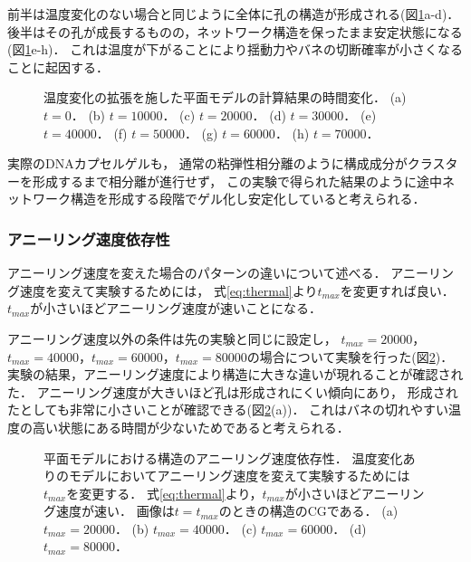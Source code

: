 前半は温度変化のない場合と同じように全体に孔の構造が形成される(図\ref{fig:result_2d_with_anearing}a-d)．
後半はその孔が成長するものの，ネットワーク構造を保ったまま安定状態になる(図\ref{fig:result_2d_with_anearing}e-h)．
これは温度が下がることにより揺動力やバネの切断確率が小さくなることに起因する．
\begin{figure}
    \centering
    
    \caption{
        温度変化の拡張を施した平面モデルの計算結果の時間変化．
        (a) $t=0$．
        (b) $t=10000$．
        (c) $t=20000$．
        (d) $t=30000$．
        (e) $t=40000$．
        (f) $t=50000$．
        (g) $t=60000$．
        (h) $t=70000$．
    }
    \label{fig:result_2d_with_anearing}
\end{figure}

実際のDNAカプセルゲルも，
通常の粘弾性相分離のように構成成分がクラスターを形成するまで相分離が進行せず，
この実験で得られた結果のように途中ネットワーク構造を形成する段階でゲル化し安定化していると考えられる．


\subsubsection{アニーリング速度依存性}
アニーリング速度を変えた場合のパターンの違いについて述べる．
アニーリング速度を変えて実験するためには，
式\ref{eq:thermal}より$t_{max}$を変更すれば良い．
$t_{max}$が小さいほどアニーリング速度が速いことになる．

アニーリング速度以外の条件は先の実験と同じに設定し，
$t_{max}=20000$，$t_{max}=40000$，$t_{max}=60000$，$t_{max}=80000$の場合について実験を行った(図\ref{fig:result_2d_anearing_speed})．
実験の結果，アニーリング速度により構造に大きな違いが現れることが確認された．
アニーリング速度が大きいほど孔は形成されにくい傾向にあり，
形成されたとしても非常に小さいことが確認できる(図\ref{fig:result_2d_anearing_speed}(a))．
これはバネの切れやすい温度の高い状態にある時間が少ないためであると考えられる．
\begin{figure}
    \centering
    
    \caption{
        平面モデルにおける構造のアニーリング速度依存性．
        温度変化ありのモデルにおいてアニーリング速度を変えて実験するためには$t_{max}$を変更する．
        式\ref{eq:thermal}より，$t_{max}$が小さいほどアニーリング速度が速い．
        画像は$t=t_{max}$のときの構造のCGである．
        (a) $t_{max}=20000$．
        (b) $t_{max}=40000$．
        (c) $t_{max}=60000$．
        (d) $t_{max}=80000$．
    }
    \label{fig:result_2d_anearing_speed}
\end{figure}

